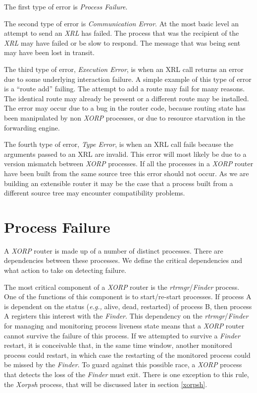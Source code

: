 \documentclass[11pt]{article}
\makeatletter
\newcommand{\eg}{\emph{e.g.,}\xspace}
\newcommand{\xorp} {{\em XORP}\@\xspace}
\newcommand{\finder} {{\em Finder}\@\xspace}
\newcommand{\xorpsh} {{\em Xorpsh}\@\xspace}
\newcommand{\xrl} {{\em XRL}\@\xspace}
\newcommand{\rtrmgr} {{\em rtrmgr}\@\xspace}
\makeatother
\begin{document}
The first type of error is {\em Process Failure}.

The second type of error is {\em Communication Error}. At the most
basic level an attempt to send an \xrl has failed. The process that
was the recipient of the \xrl may have failed or be slow to respond.
The message that was being sent may have been lost in transit.

The third type of error, {\em Execution Error}, is when an XRL call
returns an error due to some underlying interaction failure. A simple
example of this type of error is a ``route add'' failing. The attempt to
add a route may fail for many reasons. The identical route may already
be present or a different route may be installed. The error may occur
due to a bug in the router code, because routing state has been
manipulated by non \xorp processes, or due to resource starvation in
the forwarding engine.

The fourth type of error, {\em Type Error}, is when an XRL call fails
because the arguments passed to an XRL are invalid. This error will
most likely be due to a version mismatch between \xorp processes. If
all the processes in a \xorp router have been built from the same
source tree this error should not occur. As we are building an
extensible router it may be the case that a process built from a
different source tree may encounter compatibility problems.

\section{\label{pfailure}Process Failure}

A \xorp router is made up of a number of distinct processes. There are
dependencies between these processes. We define the critical
dependencies and what action to take on detecting failure.

The most critical component of a \xorp router is the \rtrmgr/\finder
process. One of the functions of this component is to start/re-start
processes. If process A is dependent on the status (\eg alive, dead,
restarted) of process B, then process A registers this interest with
the \finder. This dependency on the \rtrmgr/\finder for managing and
monitoring process liveness state means that a \xorp router cannot
survive the failure of this process. If we attempted to survive a
\finder restart, it is conceivable that, in the same time window,
another monitored process could restart, in which case the restarting
of the monitored process could be missed by the \finder. To guard
against this possible race, a \xorp process that detects the loss of
the \finder must exit. There is one exception to this rule, the
\xorpsh process, that will be discussed later in section \ref{xorpsh}.
\end{document}
